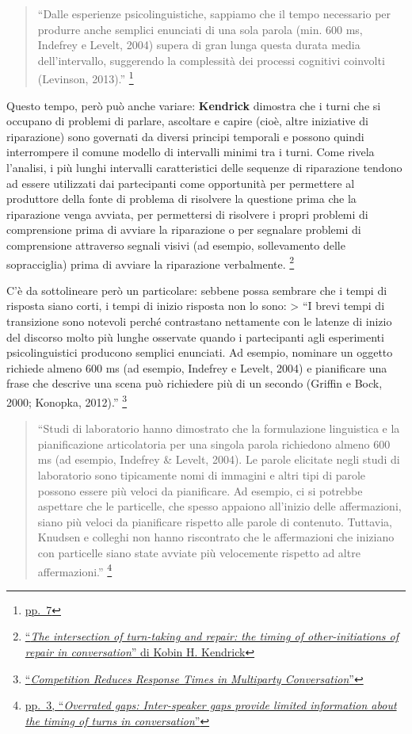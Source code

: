 \documentclass[
]{article}
\begin{document}
\begin{quote}
``Dalle esperienze psicolinguistiche, sappiamo che il tempo necessario per produrre anche semplici enunciati di una sola parola (min. 600 ms, Indefrey e Levelt, 2004) supera di gran lunga questa durata media dell'intervallo, suggerendo la complessità dei processi cognitivi coinvolti (Levinson, 2013).'' \footnote{\href{DOC/608110.pdf}{pp.~7}}
\end{quote}

Questo tempo, però può anche variare: \textbf{Kendrick} dimostra che i turni che si occupano di problemi di parlare, ascoltare e capire (cioè, altre iniziative di riparazione) sono governati da diversi principi temporali e possono quindi interrompere il comune modello di intervalli minimi tra i turni. Come rivela l'analisi, i più lunghi intervalli caratteristici delle sequenze di riparazione tendono ad essere utilizzati dai partecipanti come opportunità per permettere al produttore della fonte di problema di risolvere la questione prima che la riparazione venga avviata, per permettersi di risolvere i propri problemi di comprensione prima di avviare la riparazione o per segnalare problemi di comprensione attraverso segnali visivi (ad esempio, sollevamento delle sopracciglia) prima di avviare la riparazione verbalmente. \footnote{\href{https://www.frontiersin.org/articles/10.3389/fpsyg.2015.00250/full}{``\emph{The intersection of turn-taking and repair: the timing of other-initiations of repair in conversation}'' di Kobin H. Kendrick}}

C'è da sottolineare però un particolare: sebbene possa sembrare che i tempi di risposta siano corti, i tempi di inizio risposta non lo sono: \textgreater{} ``I brevi tempi di transizione sono notevoli perché contrastano nettamente con le latenze di inizio del discorso molto più lunghe osservate quando i partecipanti agli esperimenti psicolinguistici producono semplici enunciati. Ad esempio, nominare un oggetto richiede almeno 600 ms (ad esempio, Indefrey e Levelt, 2004) e pianificare una frase che descrive una scena può richiedere più di un secondo (Griffin e Bock, 2000; Konopka, 2012).'' \footnote{\href{DOC/fpsyg-12-693124.pdf}{``\emph{Competition Reduces Response Times in Multiparty Conversation}''}}

\begin{quote}
``Studi di laboratorio hanno dimostrato che la formulazione linguistica e la pianificazione articolatoria per una singola parola richiedono almeno 600 ms (ad esempio, Indefrey \& Levelt, 2004). Le parole elicitate negli studi di laboratorio sono tipicamente nomi di immagini e altri tipi di parole possono essere più veloci da pianificare. Ad esempio, ci si potrebbe aspettare che le particelle, che spesso appaiono all'inizio delle affermazioni, siano più veloci da pianificare rispetto alle parole di contenuto. Tuttavia, Knudsen e colleghi non hanno riscontrato che le affermazioni che iniziano con particelle siano state avviate più velocemente rispetto ad altre affermazioni.'' \footnote{\href{DOC/1-s2.0-S0010027722000257-main.pdf}{pp.~3, ``\emph{Overrated gaps: Inter-speaker gaps provide limited information about the timing of turns in conversation}''}}
\end{quote}
\end{document}
